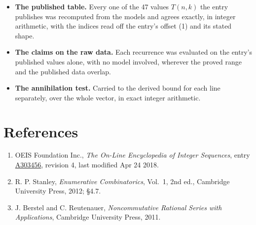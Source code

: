 \documentclass[11pt]{article}
\theoremstyle{definition}
\begin{document}
\begin{itemize}

\item {\bfseries The published table.} Every one of the 47 values $T(n,k)$ the entry publishes was recomputed from the models and agrees exactly, in integer arithmetic, with the indices read off the entry's offset (1) and its stated shape.

\item {\bfseries The claims on the raw data.} Each recurrence was evaluated on the entry's published values alone, with no model involved, wherever the proved range and the published data overlap.

\item {\bfseries The annihilation test.} Carried to the derived bound for each line separately, over the whole vector, in exact integer arithmetic.

\end{itemize}

\section{References}

\begin{enumerate}

\item OEIS Foundation Inc., \emph{The On-Line Encyclopedia of Integer Sequences}, entry \href{https://oeis.org/A303456}{A303456}, revision 4, last modified Apr 24 2018.

\item R. P. Stanley, \emph{Enumerative Combinatorics}, Vol.~1, 2nd ed., Cambridge University Press, 2012; \S4.7.

\item J. Berstel and C. Reutenauer, \emph{Noncommutative Rational Series with Applications}, Cambridge University Press, 2011.

\end{enumerate}
\end{document}
